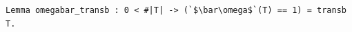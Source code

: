 \begin{lstlisting}[language=Rocq]
Lemma omegabar_transb : 0 < #|T| -> (`$\bar\omega$`(T) == 1) = transb T.
\end{lstlisting}
